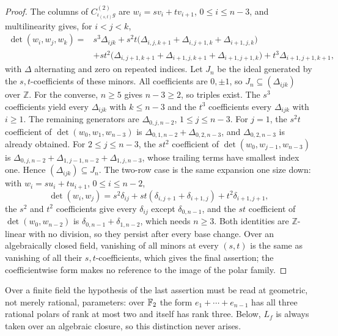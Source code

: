 \begin{proof}
The columns of \(C^{(2)}_{\iota_{(s,t)}g}\) are \(w_i=sv_i+tv_{i+1}\),
\(0\leq i\leq n-3\), and multilinearity gives, for \(i<j<k\),
\begin{align*}
 \det(w_i,w_j,w_k)
 ={}&s^3\Delta_{ijk}
 +s^2t\bigl(\Delta_{i,j,k+1}+\Delta_{i,j+1,k}+\Delta_{i+1,j,k}\bigr)\\
 &+st^2\bigl(\Delta_{i,j+1,k+1}+\Delta_{i+1,j,k+1}+\Delta_{i+1,j+1,k}\bigr)
 +t^3\Delta_{i+1,j+1,k+1},
\end{align*}
with \(\Delta\) alternating and zero on repeated indices.  Let \(J_n\) be
the ideal generated by the \(s,t\)-coefficients of these minors.  All
coefficients are \(0,\pm1\), so \(J_n\subseteq(\Delta_{ijk})\) over
\(\mathbb Z\).  For the
converse, \(n\geq5\) gives \(n-3\geq2\), so triples exist.  The \(s^3\)
coefficients yield every \(\Delta_{ijk}\) with \(k\leq n-3\) and the \(t^3\)
coefficients every \(\Delta_{ijk}\) with \(i\geq1\).  The remaining generators
are \(\Delta_{0,j,n-2}\), \(1\leq j\leq n-3\).  For \(j=1\), the \(s^2t\)
coefficient of \(\det(w_0,w_1,w_{n-3})\) is
\(\Delta_{0,1,n-2}+\Delta_{0,2,n-3}\), and \(\Delta_{0,2,n-3}\) is already
obtained.  For \(2\leq j\leq n-3\), the \(st^2\) coefficient of
\(\det(w_0,w_{j-1},w_{n-3})\) is
\(\Delta_{0,j,n-2}+\Delta_{1,j-1,n-2}+\Delta_{1,j,n-3}\), whose trailing
terms have smallest index one.  Hence \((\Delta_{ijk})\subseteq J_n\).
The two-row case is the same expansion one size down: with
\(w_i=su_i+tu_{i+1}\), \(0\leq i\leq n-2\),
\[
 \det(w_i,w_j)=s^2\delta_{ij}+st(\delta_{i,j+1}+\delta_{i+1,j})
 +t^2\delta_{i+1,j+1},
\]
the \(s^2\) and \(t^2\) coefficients give every \(\delta_{ij}\) except
\(\delta_{0,n-1}\), and the \(st\) coefficient of \(\det(w_0,w_{n-2})\) is
\(\delta_{0,n-1}+\delta_{1,n-2}\), which needs \(n\geq3\).  Both identities
are \(\mathbb Z\)-linear with no division, so they persist after every base
change.  Over an algebraically closed field, vanishing of all minors at every
\((s,t)\) is the same as vanishing of all their \(s,t\)-coefficients, which
gives the final assertion; the coefficientwise form makes no reference to
the image of the polar family.
\end{proof}

Over a finite field the hypothesis of the last assertion must be read at
geometric, not merely rational, parameters: over \(\mathbb F_2\) the form
\(e_1+\cdots+e_{n-1}\) has all three rational polars of rank at most two and
itself has rank three.  Below, \(L_f\) is always taken over an algebraic
closure, so this distinction never arises.

